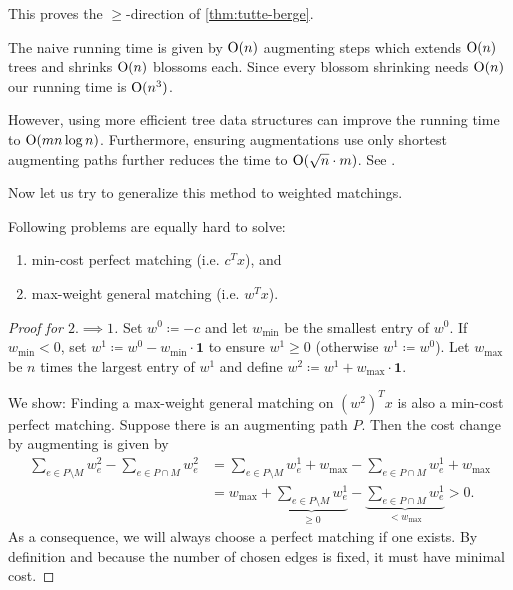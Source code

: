 \begin{corollary} \label{thm:reverse-tb}
    This proves the $\geq$-direction of \autoref{thm:tutte-berge}.
\end{corollary}
\begin{remark}
    The naive running time is given by $\mathrm{O}(n)$ augmenting steps which extends $\mathrm{O}(n)$ trees and shrinks $\mathrm{O}(n)$ blossoms each.
    Since every blossom shrinking needs $\mathrm{O}(n)$ our running time is $\mathrm{O}(n^3)$.

    However, using more efficient tree data structures can improve the running time to $\mathrm{O}(mn \log n)$.
    Furthermore, ensuring augmentations use only shortest augmenting paths further reduces the time to $\mathrm{O}(\sqrt{n} \cdot m)$.
    See \cite[Thm.~5.11]{comb-optimization-cook}.
\end{remark}
Now let us try to  generalize this method to weighted matchings.
\begin{theorem}
    Following problems are equally hard to solve:
    \begin{enumerate}
        \item min-cost perfect matching (i.e. $c^Tx$), and
        \item max-weight general matching (i.e. $w^Tx$).
    \end{enumerate}
\end{theorem}
\begin{proof}[Proof for $2. \implies 1$]
    Set $w^0 \coloneqq -c$ and let $w_{\min}$ be the smallest entry of $w^0$.
    If $w_{\min} < 0$, set $w^1 \coloneqq w^0-w_{\min} \cdot \mathbf{1}$ to ensure $w^1 \geq 0$ (otherwise $w^1 \coloneqq w^0$).
    Let $w_{\max}$ be $n$ times the largest entry of $w^1$ and define $w^2 \coloneqq w^1 + w_{\max} \cdot \mathbf 1$.

    We show: Finding a max-weight general matching on $(w^2)^Tx$ is also a min-cost perfect matching.
    Suppose there is an augmenting path $P$. Then the cost change by augmenting is given by
    \begin{align*}
        \sum_{e \in P \setminus M} w_e^2 - \sum_{e \in P \cap M} w_e^2 & = \sum_{e \in P \setminus M} w_e^1 + w_{\max} - \sum_{e \in P \cap M} w_e^1 + w_{\max}                                           \\
                                                                       & = w_{\max} + \underbrace{\sum_{e \in P \setminus M} w_e^1}_{\geq 0} - \underbrace{\sum_{e \in P \cap M} w_e^1}_{< w_{\max}} > 0.
    \end{align*}
    As a consequence, we will always choose a perfect matching if one exists.
    By definition and because the number of chosen edges is fixed, it must have minimal cost.
\end{proof}
